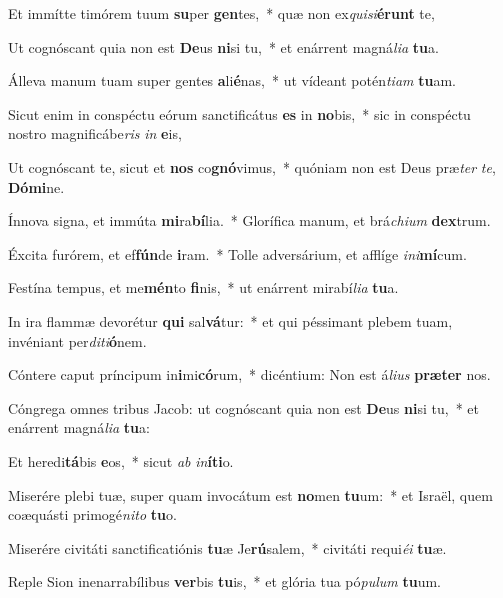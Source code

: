 \item Et immítte timórem tuum \textbf{su}per \textbf{gen}tes,~* quæ non ex\textit{qui}\textit{si}\textbf{é}\textbf{runt} te,
\item Ut cognóscant quia non est \textbf{De}us \textbf{ni}si tu,~* et enárrent magná\textit{li}\textit{a} \textbf{tu}a.
\item Álleva manum tuam super gentes \textbf{a}li\textbf{é}nas,~* ut vídeant potén\textit{ti}\textit{am} \textbf{tu}am.
\item Sicut enim in conspéctu eórum sanctificátus \textbf{es} in \textbf{no}bis,~* sic in conspéctu nostro magnificábe\textit{ris} \textit{in} \textbf{e}is,
\item Ut cognóscant te, sicut et \textbf{nos} co\textbf{gnó}vimus,~* quóniam non est Deus præ\textit{ter} \textit{te}, \textbf{Dó}\textbf{mi}ne.
\item Ínnova signa, et immúta \textbf{mi}ra\textbf{bí}lia.~* Glorífica manum, et brá\textit{chi}\textit{um} \textbf{dex}trum.
\item Éxcita furórem, et ef\textbf{fún}de \textbf{i}ram.~* Tolle adversárium, et afflíge \textit{in}\textit{i}\textbf{mí}cum.
\item Festína tempus, et me\textbf{mén}to \textbf{fi}nis,~* ut enárrent mirabí\textit{li}\textit{a} \textbf{tu}a.
\item In ira flammæ devorétur \textbf{qui} sal\textbf{vá}tur:~* et qui péssimant plebem tuam, invéniant per\textit{di}\textit{ti}\textbf{ó}nem.
\item Cóntere caput príncipum in\textbf{i}mi\textbf{có}rum,~* dicéntium: Non est á\textit{li}\textit{us} \textbf{præ}\textbf{ter} nos.
\item Cóngrega omnes tribus Jacob: ut cognóscant quia non est \textbf{De}us \textbf{ni}si tu,~* et enárrent magná\textit{li}\textit{a} \textbf{tu}a:
\item Et heredi\textbf{tá}bis \textbf{e}os,~* sicut \textit{ab} \textit{in}\textbf{í}\textbf{ti}o.
\item Miserére plebi tuæ, super quam invocátum est \textbf{no}men \textbf{tu}um:~* et Israël, quem coæquásti primogé\textit{ni}\textit{to} \textbf{tu}o.
\item Miserére civitáti sanctificatiónis \textbf{tu}æ Je\textbf{rú}salem,~* civitáti requi\textit{é}\textit{i} \textbf{tu}æ.
\item Reple Sion inenarrabílibus \textbf{ver}bis \textbf{tu}is,~* et glória tua pó\textit{pu}\textit{lum} \textbf{tu}um.
